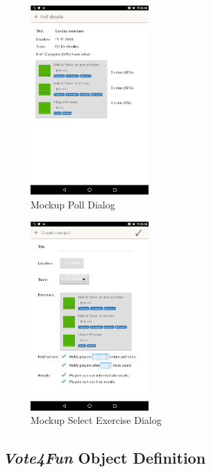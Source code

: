 \begin{figure}[H]
    \begin{center}
        \includegraphics[width=0.4\textwidth]{images/mockups/poll.png}
        \caption{Mockup Poll Dialog}
        \label{fig:mockup_poll}
    \end{center}
\end{figure}

\begin{figure}[H]
    \begin{center}
        \includegraphics[width=0.4\textwidth]{images/mockups/create.png}
        \caption{Mockup Select Exercise Dialog}
        \label{fig:mockup_select}
    \end{center}
\end{figure}

\subsection{\textit{Vote4Fun} Object Definition}
\label{ssec:vote4fun_object_definition}

